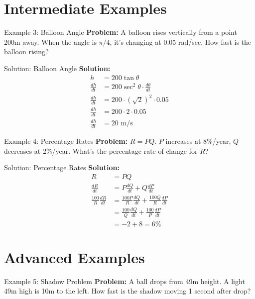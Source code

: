 \documentclass[aspectratio=169]{beamer}
\begin{document}
\section{Intermediate Examples}

\begin{frame}{Example 3: Balloon Angle}
\textbf{Problem:} A balloon rises vertically from a point 200m away. When the angle is $\pi/4$, it's changing at 0.05 rad/sec. How fast is the balloon rising?
\end{frame}

\begin{frame}{Solution: Balloon Angle}
\textbf{Solution:}
\[
\begin{aligned}
  h &= 200 \tan \theta \\
  \frac{dh}{dt} &= 200 \sec^2 \theta \cdot \frac{d\theta}{dt} \\
  \frac{dh}{dt} &= 200 \cdot (\sqrt{2})^2 \cdot 0.05 \\
  \frac{dh}{dt} &= 200 \cdot 2 \cdot 0.05 \\
  \frac{dh}{dt} &= 20 \text{ m/s}
\end{aligned}
\]
\end{frame}

\begin{frame}{Example 4: Percentage Rates}
\textbf{Problem:} $R = PQ$. $P$ increases at 8\%/year, $Q$ decreases at 2\%/year. What's the percentage rate of change for $R$?
\end{frame}

\begin{frame}{Solution: Percentage Rates}
\textbf{Solution:}
\[
\begin{aligned}
  R &= PQ \\
  \frac{dR}{dt} &= P\frac{dQ}{dt} + Q\frac{dP}{dt} \\
  \frac{100}{R}\frac{dR}{dt} &= \frac{100P}{R}\frac{dQ}{dt} + \frac{100Q}{R}\frac{dP}{dt} \\
  &= \frac{100}{Q}\frac{dQ}{dt} + \frac{100}{P}\frac{dP}{dt} \\
  &= -2 + 8 = 6\%
\end{aligned}
\]
\end{frame}

\section{Advanced Examples}

\begin{frame}{Example 5: Shadow Problem}
\textbf{Problem:} A ball drops from 49m height. A light 49m high is 10m to the left. How fast is the shadow moving 1 second after drop?
\end{frame}
\end{document}
